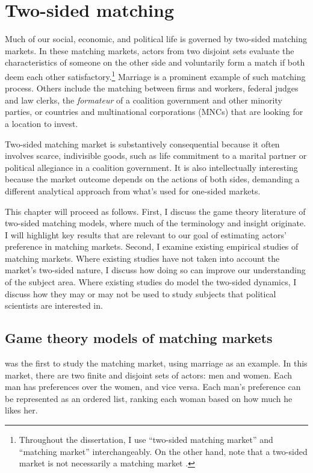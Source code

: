 \chapter{Two-sided matching}

Much of our social, economic, and political life is governed by two-sided
matching markets. In these matching markets, actors from two disjoint sets
evaluate the characteristics of someone on the other side and voluntarily form a
match if both deem each other satisfactory.\footnote{Throughout the
  dissertation, I use ``two-sided matching market'' and ``matching market''
  interchangeably. On the other hand, note that a two-sided market is not
  necessarily a matching market \citep{Rysman2009}.} Marriage is a prominent
example of such matching process. Others include the matching between firms and
workers, federal judges and law clerks, the \textit{formateur} of a coalition
government and other minority parties, or countries and multinational
corporations (MNCs) that are looking for a location to invest.

Two-sided matching market is substantively consequential because it often
involves scarce, indivisible goods, such as life commitment to a marital partner
or political allegiance in a coalition government. It is also intellectually
interesting because the market outcome depends on the actions of both sides,
demanding a different analytical approach from what's used for one-sided
markets.

This chapter will proceed as follows. First, I discuss the game theory
literature of two-sided matching models, where much of the terminology and
insight originate. I will highlight key results that are relevant to our goal of
estimating actors' preference in matching markets. Second, I examine existing
empirical studies of matching markets. Where existing studies have not taken
into account the market's two-sided nature, I discuss how doing so can improve
our understanding of the subject area. Where existing studies do model the
two-sided dynamics, I discuss how they may or may not be used to study subjects
that political scientists are interested in.

\section{Game theory models of matching markets}
\label{sec:game_theory}

\citet{Gale1962} was the first to study the matching market, using marriage as
an example. In this market, there are two finite and disjoint sets of actors:
men and women. Each man has preferences over the women, and vice versa. Each
man's preference can be represented as an ordered list, ranking each woman based
on how much he likes her.

